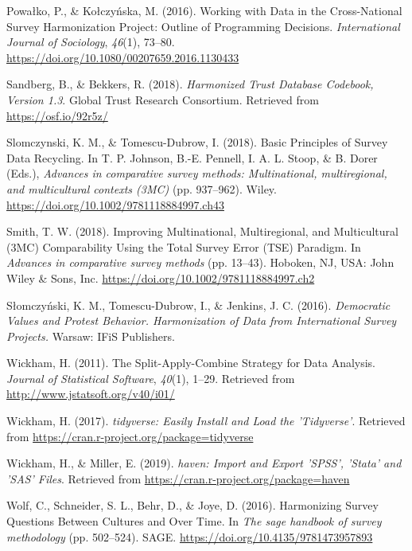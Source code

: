 \documentclass[12pt,]{article}
\begin{document}
\leavevmode\hypertarget{ref-Powako2016}{}%
Powałko, P., \& Kołczyńska, M. (2016). Working with Data in the Cross-National Survey Harmonization Project: Outline of Programming Decisions. \emph{International Journal of Sociology}, \emph{46}(1), 73--80. \url{https://doi.org/10.1080/00207659.2016.1130433}

\leavevmode\hypertarget{ref-Sandberg2018}{}%
Sandberg, B., \& Bekkers, R. (2018). \emph{Harmonized Trust Database Codebook, Version 1.3}. Global Trust Research Consortium. Retrieved from \url{https://osf.io/92r5z/}

\leavevmode\hypertarget{ref-Slomczynski2018}{}%
Slomczynski, K. M., \& Tomescu-Dubrow, I. (2018). Basic Principles of Survey Data Recycling. In T. P. Johnson, B.-E. Pennell, I. A. L. Stoop, \& B. Dorer (Eds.), \emph{Advances in comparative survey methods: Multinational, multiregional, and multicultural contexts (3MC)} (pp. 937--962). Wiley. \url{https://doi.org/10.1002/9781118884997.ch43}

\leavevmode\hypertarget{ref-Smith2018}{}%
Smith, T. W. (2018). Improving Multinational, Multiregional, and Multicultural (3MC) Comparability Using the Total Survey Error (TSE) Paradigm. In \emph{Advances in comparative survey methods} (pp. 13--43). Hoboken, NJ, USA: John Wiley \& Sons, Inc. \url{https://doi.org/10.1002/9781118884997.ch2}

\leavevmode\hypertarget{ref-Slomczynskietal2016}{}%
Słomczyński, K. M., Tomescu-Dubrow, I., \& Jenkins, J. C. (2016). \emph{Democratic Values and Protest Behavior. Harmonization of Data from International Survey Projects.} Warsaw: IFiS Publishers.

\leavevmode\hypertarget{ref-Wickham2011}{}%
Wickham, H. (2011). The Split-Apply-Combine Strategy for Data Analysis. \emph{Journal of Statistical Software}, \emph{40}(1), 1--29. Retrieved from \url{http://www.jstatsoft.org/v40/i01/}

\leavevmode\hypertarget{ref-tidyverse}{}%
Wickham, H. (2017). \emph{tidyverse: Easily Install and Load the 'Tidyverse'}. Retrieved from \url{https://cran.r-project.org/package=tidyverse}

\leavevmode\hypertarget{ref-haven}{}%
Wickham, H., \& Miller, E. (2019). \emph{haven: Import and Export 'SPSS', 'Stata' and 'SAS' Files}. Retrieved from \url{https://cran.r-project.org/package=haven}

\leavevmode\hypertarget{ref-Wolf2016}{}%
Wolf, C., Schneider, S. L., Behr, D., \& Joye, D. (2016). Harmonizing Survey Questions Between Cultures and Over Time. In \emph{The sage handbook of survey methodology} (pp. 502--524). SAGE. \url{https://doi.org/10.4135/9781473957893}
\end{document}
